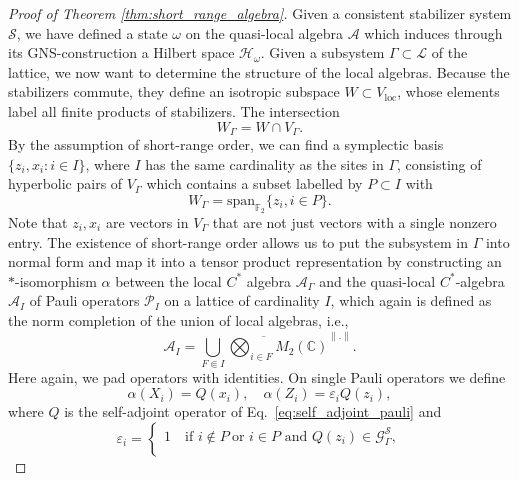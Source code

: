 \documentclass[aps,pra,reprint,superscriptaddress]{revtex4-2}
\newcommand{\cA}{{\mathcal A}}
\newcommand{\cG}{{\mathcal G}}
\newcommand{\cH}{{\mathcal H}}
\newcommand{\cL}{{\mathcal L}}
\newcommand{\cP}{{\mathcal P}}
\newcommand{\cS}{{\mathcal S}}
\renewcommand\a{\alpha}
\newcommand\ve{\varepsilon}
\newcommand\G{\Gamma}
\newcommand\w{\omega}
\providecommand{\norm}[1]{\lVert #1\rVert}
\theoremstyle{definition}
\theoremstyle{remark}
\begin{document}
    \begin{proof}[Proof of Theorem \ref{thm:short_range_algebra}]
    Given a consistent stabilizer system $\cS$, we have defined a state
    $\w$ on
    the quasi-local algebra $\cA$ which induces through its
    GNS-construction a Hilbert space $\cH_\w$. Given a subsystem $\G
    \subset \cL$ of the lattice, we now want to determine the structure of the local algebras.
    Because the stabilizers commute, they define an isotropic subspace $W
    \subset V_{\text{loc}}$, whose elements label all finite products of
    stabilizers. The intersection
    \begin{equation}
        W_\G = W \cap V_{\G}.
    \end{equation}
    By the assumption of short-range order, we can find a symplectic basis $\{z_i, x_i : i \in I \}$, where $I$ has the
    same cardinality as the sites in $\G$, consisting of hyperbolic pairs of $V_\G$
    which contains a subset labelled by $P \subset I$ with
    \begin{equation}
        W_\G = \mathrm{span}_{\mathbb{F}_2} \{z_i, i \in P \}.
    \end{equation}
    Note that $z_i,x_i$ are vectors in $V_\G$ that are not just vectors
    with a single nonzero entry. 
    The existence of short-range order allows us to put the subsystem in $\G$ into normal form \cite{Calderbank:1996aj} and map it into a tensor product representation by constructing an $\ast$-isomorphism $\a$ between the local $C^\ast$ algebra $\cA_\G$ and the quasi-local $C^\ast$-algebra $\cA_I$ of Pauli operators $\cP_I$ on a lattice of cardinality $I$, which again is defined as the norm completion of the union of local algebras, i.e.,
    \begin{equation}
        \cA_I = \overline{\bigcup_{F \Subset I} \bigotimes_{i \in F} M_2(\mathbb{C})}^{\norm{.}}.
    \end{equation}
    Here again, we pad operators with identities.
    On single Pauli operators we define
    \begin{equation}\label{eq:define_alpha}
        \a(X_i) = Q(x_i),\quad \a(Z_i) = \ve_i Q(z_i),
    \end{equation}
    where $Q$ is the self-adjoint operator of Eq.~\eqref{eq:self_adjoint_pauli} and 
    \begin{equation}
        \ve_i = \begin{cases}
        1 \quad \text{if } i \notin P\ \text{or } i \in P \text{ and }Q(z_i) \in \cG^{\cS}_\G,\\

\end{cases}
\end{equation}
\end{proof}
\end{document}
